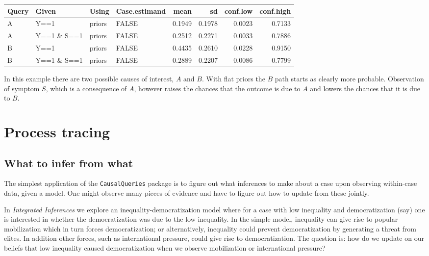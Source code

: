 \documentclass[
  12pt,
]{book}
\begin{document}
\begin{tabular}{l|l|l|l|r|r|r|r}
\hline
Query & Given & Using & Case.estimand & mean & sd & conf.low & conf.high\\
\hline
A & Y==1 & priors & FALSE & 0.1949 & 0.1978 & 0.0023 & 0.7133\\
\hline
A & Y==1 \& S==1 & priors & FALSE & 0.2512 & 0.2271 & 0.0033 & 0.7886\\
\hline
B & Y==1 & priors & FALSE & 0.4435 & 0.2610 & 0.0228 & 0.9150\\
\hline
B & Y==1 \& S==1 & priors & FALSE & 0.2889 & 0.2207 & 0.0086 & 0.7799\\
\hline
\end{tabular}

In this example there are two possible causes of interest, \(A\) and \(B\). With flat priors the \(B\) path starts as clearly more probable. Observation of symptom \(S\), which is a consequence of \(A\), however raises the chances that the outcome is due to \(A\) and lowers the chances that it is due to \(B\).

\hypertarget{process-tracing}{%
\chapter{Process tracing}\label{process-tracing}}

\hypertarget{what-to-infer-from-what}{%
\section{What to infer from what}\label{what-to-infer-from-what}}

The simplest application of the \texttt{CausalQueries} package is to figure out what inferences to make about a case upon observing within-case data, given a model. One might observe many pieces of evidence and have to figure out how to update from these jointly.

In \emph{Integrated Inferences} we explore an inequality-democratization model where for a case with low inequality and democratization (say) one is interested in whether the democratization was due to the low inequality. In the simple model, inequality can give rise to popular mobilization which in turn forces democratization; or alternatively, inequality could prevent democratization by generating a threat from elites. In addition other forces, such as international pressure, could give rise to democratization. The question is: how do we update on our beliefs that low inequality caused democratization when we observe mobilization or international pressure?
\end{document}
